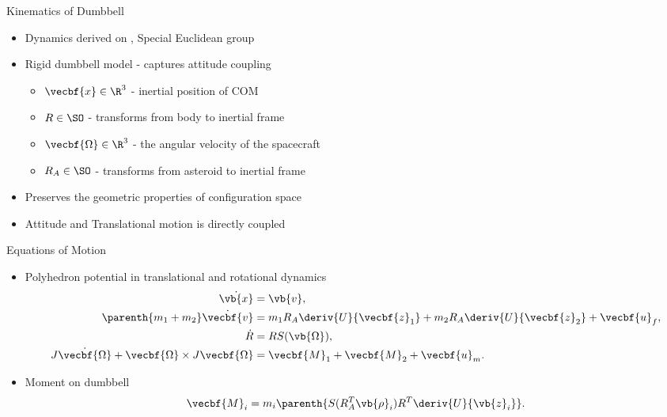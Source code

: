 \documentclass[11pt,professionalfonts]{beamer}
\begin{document}
\begin{frame}{Kinematics of Dumbbell}
    \begin{itemize}
        \item Dynamics derived on \SE, Special Euclidean group
        \item Rigid dumbbell model - captures attitude coupling
        \pause
        \begin{itemize}
            \item \( \vecbf{x} \in \R^3 \) - inertial position of COM
            \item \( R \in \SO\) - transforms from body to inertial frame
            \item \( \vecbf{\Omega} \in \R^3 \) - the angular velocity of the spacecraft 
            \item \( R_A \in \SO \) - transforms from asteroid to inertial frame
        \end{itemize}    
        \pause
    \item Preserves the geometric properties of configuration space
    \item Attitude and Translational motion is directly coupled
\end{itemize}

\end{frame}

\begin{frame}{Equations of Motion}

    \begin{itemize}
        \item Polyhedron potential in translational and rotational dynamics
        \begin{align*}
            \dot{\vb{x}} &= \vb{v}, \\
            \parenth{m_1 + m_2} \dot{\vecbf{v}} &= m_1 R_A \deriv{U}{\vecbf{z}_1} + m_2 R_A \deriv{U}{\vecbf{z}_2} + \vecbf{u}_f, \\
            \dot{R} &= R S(\vb{\Omega}) , \\
            J \dot{\vecbf{\Omega}} + \vecbf{\Omega} \times J \vecbf{\Omega} &= \vecbf{M}_1 + \vecbf{M}_2 + \vecbf{u}_m. 
        \end{align*}
    \item Moment on dumbbell
        \begin{align*}
            \vecbf{M}_i = m_i \parenth{S(R_A^T \vb{\rho}_i) R^T \deriv{U}{\vb{z}_i}}.
        \end{align*}
    \end{itemize}
\end{frame}
\end{document}
